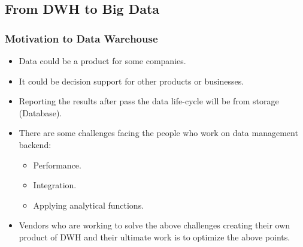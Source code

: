 

\subsection{From DWH to Big Data}
\begin{frame}
\frametitle{Motivation to Data Warehouse}
\begin{itemize}[<+->]
\item Data could be a product for some companies.
\item It could be decision support for other products or businesses.
\item Reporting the results after pass the data life-cycle will be from storage (Database).
\item There are some challenges facing the people who work on data management backend:
\begin{itemize}
\item Performance.
\item Integration.
\item Applying analytical functions. %
\end{itemize}
\item Vendors who are working to solve the above challenges creating their own product of DWH and their ultimate work is to optimize the above points.
\end{itemize}
\end{frame}

